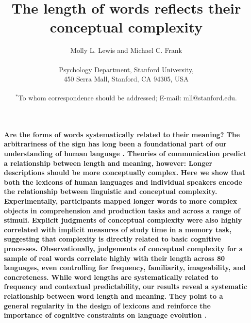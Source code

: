 \documentclass[12pt]{article}
\title{The length of words reflects their conceptual complexity}
\author
{Molly L. Lewis and Michael C. Frank\\
\\
\normalsize{Psychology Department, Stanford University,}\\
\normalsize{450 Serra Mall, Stanford, CA 94305, USA}\\
\\
\normalsize{$^\ast$To whom correspondence should be addressed; E-mail: mll@stanford.edu.}
}
\date{}
\newenvironment{sciabstract}{%
\begin{quote} \bf}
{\end{quote}}
\begin{document}
 

\baselineskip24pt

\maketitle 




{\bf Are the forms of words systematically related to their meaning? The arbitrariness of the sign has long been a foundational part of our understanding of human language \cite{saussure,hockett1960}. Theories of communication predict a relationship between length and meaning, however: Longer descriptions should be more conceptually complex.\cite{horn1984, levy2006} Here we show that both the lexicons of human languages and individual speakers encode the relationship between linguistic and conceptual complexity. Experimentally, participants mapped longer words to more complex objects in comprehension and production tasks and across a range of stimuli. Explicit judgments of conceptual complexity were also highly correlated with implicit measures of study time in a memory task, suggesting that complexity is directly related to basic cognitive processes. Observationally, judgements of conceptual complexity for a sample of real words correlate highly with their length across 80 languages, even controlling for frequency, familiarity, imageability, and concreteness. While word lengths are systematically related to frequency and contextual predictability,\cite{zipf1936,piantadosi2011a} our results reveal a systematic relationship between word length and meaning. They point to a general regularity in the design of lexicons and reinforce the importance of cognitive constraints on language evolution \cite{christiansen2008,kirby2007,lieberman2007}.}


\end{document}

